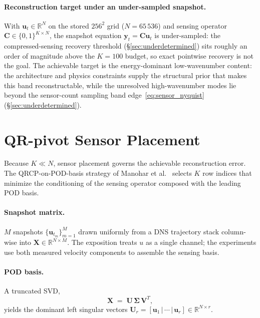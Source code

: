 \paragraph{Reconstruction target under an under-sampled snapshot.}
With $\mathbf{u}_t \in \mathbb{R}^N$ on the stored $256^2$ grid ($N = 65\,536$) and sensing operator $\mathbf{C}\in\{0,1\}^{K\times N}$, the snapshot equation $\mathbf{y}_t = \mathbf{C}\mathbf{u}_t$ is under-sampled: the compressed-sensing recovery threshold (\S\ref{sec:underdetermined}) sits roughly an order of magnitude above the $K=100$ budget, so exact pointwise recovery is not the goal. The achievable target is the energy-dominant low-wavenumber content: the architecture and physics constraints supply the structural prior that makes this band reconstructable, while the unresolved high-wavenumber modes lie beyond the sensor-count sampling band edge~\eqref{eq:sensor_nyquist} (\S\ref{sec:underdetermined}).

\section{QR-pivot Sensor Placement}
\label{sec:sensor_placement}

Because $K \ll N$, sensor placement governs the achievable reconstruction error. The QRCP-on-POD-basis strategy of Manohar et al.~\cite{Manohar2018PNAS, Drmac2016SISC} selects $K$ row indices that minimize the conditioning of the sensing operator composed with the leading POD basis.

\paragraph{Snapshot matrix.}
$M$ snapshots $\{\mathbf{u}_{t_m}\}_{m=1}^M$ drawn uniformly from a DNS trajectory stack column-wise into $\mathbf{X}\in\mathbb{R}^{N\times M}$. The exposition treats $u$ as a single channel; the experiments use both measured velocity components to assemble the sensing basis.

\paragraph{POD basis.}
A truncated SVD,
\begin{equation*}
    \mathbf{X} \;=\; \mathbf{U}\,\boldsymbol{\Sigma}\,\mathbf{V}^T,
\end{equation*}
yields the dominant left singular vectors $\mathbf{U}_r = [\mathbf{u}_1\,|\,\cdots\,|\,\mathbf{u}_r]\in\mathbb{R}^{N\times r}$.

